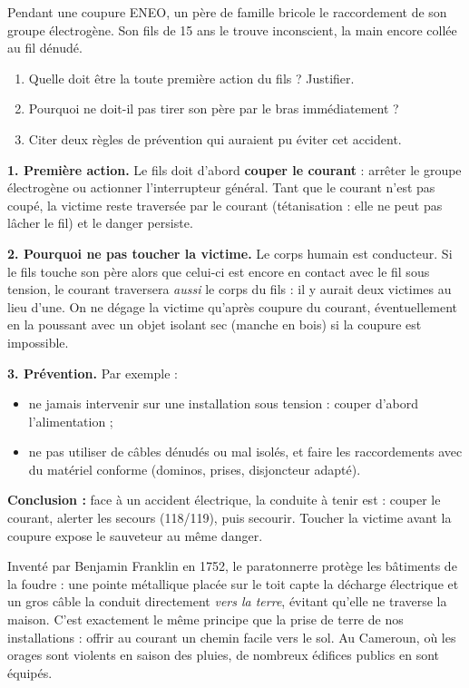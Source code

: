\documentclass[11pt]{article}
\newcommand{\cle}[1]{{\popxbold\color{popdark}#1}}
\begin{document}
\begin{exoresolu}
Pendant une coupure ENEO, un père de famille bricole le raccordement de son groupe électrogène. Son fils de 15 ans le trouve inconscient, la main encore collée au fil dénudé.
\begin{enumerate}
\item Quelle doit être la toute première action du fils ? Justifier.
\item Pourquoi ne doit-il pas tirer son père par le bras immédiatement ?
\item Citer deux règles de prévention qui auraient pu éviter cet accident.
\end{enumerate}
\tcblower
\textbf{1. Première action.} Le fils doit d'abord \textbf{couper le courant} : arrêter le groupe électrogène ou actionner l'interrupteur général. Tant que le courant n'est pas coupé, la victime reste traversée par le courant (tétanisation : elle ne peut pas lâcher le fil) et le danger persiste.

\textbf{2. Pourquoi ne pas toucher la victime.} Le corps humain est conducteur. Si le fils touche son père alors que celui-ci est encore en contact avec le fil sous tension, le courant traversera \emph{aussi} le corps du fils : il y aurait deux victimes au lieu d'une. On ne dégage la victime qu'après coupure du courant, éventuellement en la poussant avec un objet isolant sec (manche en bois) si la coupure est impossible.

\textbf{3. Prévention.} Par exemple :
\begin{itemize}
\item ne jamais intervenir sur une installation sous tension : couper d'abord l'alimentation ;
\item ne pas utiliser de câbles dénudés ou mal isolés, et faire les raccordements avec du matériel conforme (dominos, prises, disjoncteur adapté).
\end{itemize}

\textbf{Conclusion :} face à un accident électrique, la conduite à tenir est : couper le courant, alerter les secours (118/119), puis secourir. Toucher la victime avant la coupure expose le sauveteur au même danger.
\end{exoresolu}

\begin{savaistu}
Inventé par Benjamin Franklin en 1752, le \cle{paratonnerre} protège les bâtiments de la foudre : une pointe métallique placée sur le toit capte la décharge électrique et un gros câble la conduit directement \emph{vers la terre}, évitant qu'elle ne traverse la maison. C'est exactement le même principe que la prise de terre de nos installations : offrir au courant un chemin facile vers le sol. Au Cameroun, où les orages sont violents en saison des pluies, de nombreux édifices publics en sont équipés.
\end{savaistu}
\end{document}
